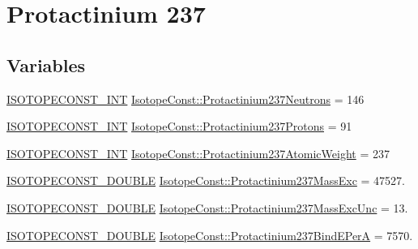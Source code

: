 \hypertarget{group___isotope_const-_protactinium-_pa237}{}\section{Protactinium 237}
\label{group___isotope_const-_protactinium-_pa237}
\subsection*{Variables}
\begin{DoxyCompactItemize}
\item 
\mbox{\hyperlink{group___isotope_const-_macros_ga5f18360b3e99483a35c32d789e62621c}{I\+S\+O\+T\+O\+P\+E\+C\+O\+N\+S\+T\+\_\+\+I\+NT}} \mbox{\hyperlink{group___isotope_const-_protactinium-_pa237_ga3ec0cd1cfe0fb5feadd71dcb6e0b2066}{Isotope\+Const\+::\+Protactinium237\+Neutrons}} = 146
\item 
\mbox{\hyperlink{group___isotope_const-_macros_ga5f18360b3e99483a35c32d789e62621c}{I\+S\+O\+T\+O\+P\+E\+C\+O\+N\+S\+T\+\_\+\+I\+NT}} \mbox{\hyperlink{group___isotope_const-_protactinium-_pa237_gadf1bbe872af2c4711a9eb4d3bfc39a20}{Isotope\+Const\+::\+Protactinium237\+Protons}} = 91
\item 
\mbox{\hyperlink{group___isotope_const-_macros_ga5f18360b3e99483a35c32d789e62621c}{I\+S\+O\+T\+O\+P\+E\+C\+O\+N\+S\+T\+\_\+\+I\+NT}} \mbox{\hyperlink{group___isotope_const-_protactinium-_pa237_gaaf44a6f897f86fed1123d364ad42f254}{Isotope\+Const\+::\+Protactinium237\+Atomic\+Weight}} = 237
\item 
\mbox{\hyperlink{group___isotope_const-_macros_ga8f45a7272ce02c0b4c65c44636ed719a}{I\+S\+O\+T\+O\+P\+E\+C\+O\+N\+S\+T\+\_\+\+D\+O\+U\+B\+LE}} \mbox{\hyperlink{group___isotope_const-_protactinium-_pa237_ga7aae58f4ff76852b31d93c7c10ced564}{Isotope\+Const\+::\+Protactinium237\+Mass\+Exc}} = 47527.
\item 
\mbox{\hyperlink{group___isotope_const-_macros_ga8f45a7272ce02c0b4c65c44636ed719a}{I\+S\+O\+T\+O\+P\+E\+C\+O\+N\+S\+T\+\_\+\+D\+O\+U\+B\+LE}} \mbox{\hyperlink{group___isotope_const-_protactinium-_pa237_ga7e9b1b200f98b2628ef9c2899924378c}{Isotope\+Const\+::\+Protactinium237\+Mass\+Exc\+Unc}} = 13.
\item 
\mbox{\hyperlink{group___isotope_const-_macros_ga8f45a7272ce02c0b4c65c44636ed719a}{I\+S\+O\+T\+O\+P\+E\+C\+O\+N\+S\+T\+\_\+\+D\+O\+U\+B\+LE}} \mbox{\hyperlink{group___isotope_const-_protactinium-_pa237_ga5c912fd89417642f30f26b8b2314eb62}{Isotope\+Const\+::\+Protactinium237\+Bind\+E\+PerA}} = 7570.

\end{DoxyCompactItemize}
